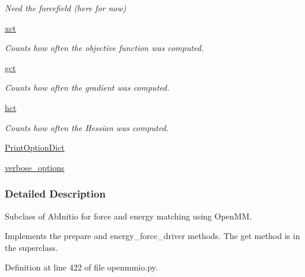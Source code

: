 \begin{DoxyCompactItemize}
\begin{DoxyCompactList}\small\item\em Need the forcefield (here for now) \end{DoxyCompactList}\item 
\hyperlink{classforcebalance_1_1target_1_1Target_aad2e385cfbf7b4a68f1c2cb41133fe82}{xct}
\begin{DoxyCompactList}\small\item\em Counts how often the objective function was computed. \end{DoxyCompactList}\item 
\hyperlink{classforcebalance_1_1target_1_1Target_aa625ac88c6744eb14ef281d9496d0dbb}{gct}
\begin{DoxyCompactList}\small\item\em Counts how often the gradient was computed. \end{DoxyCompactList}\item 
\hyperlink{classforcebalance_1_1target_1_1Target_a5b5a42f78052b47f29ed4b940c6111a1}{hct}
\begin{DoxyCompactList}\small\item\em Counts how often the Hessian was computed. \end{DoxyCompactList}\item 
\hyperlink{classforcebalance_1_1BaseClass_afc6659278497d7245bc492ecf405ccae}{Print\-Option\-Dict}
\item 
\hyperlink{classforcebalance_1_1BaseClass_afd68efa29ccd2f320f4cf82198214aac}{verbose\-\_\-options}
\end{DoxyCompactItemize}


\subsubsection{Detailed Description}
Subclass of Ab\-Initio for force and energy matching using Open\-M\-M. 

Implements the prepare and energy\-\_\-force\-\_\-driver methods. The get method is in the superclass. 

Definition at line 422 of file openmmio.\-py.




